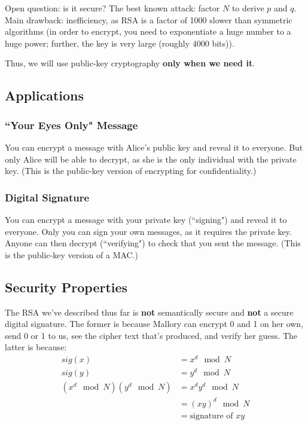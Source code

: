 \documentclass[12pt]{article}
\begin{document}
Open question: is it secure? The best known attack: factor $N$ to derive $p$ and $q$. Main drawback: inefficiency, as RSA is a factor of 1000 slower than symmetric algorithms (in order to encrypt, you need to exponentiate a huge number to a huge power; further, the key is very large (roughly $4000$ bits)).

Thus, we will use public-key cryptography \textbf{only when we need it}.

\subsection*{Applications}

\subsubsection*{``Your Eyes Only" Message}

You can encrypt a message with Alice's public key and reveal it to everyone. But only Alice will be able to decrypt, as she is the only individual with the private key. (This is the public-key version of encrypting for confidentiality.)

\subsubsection*{Digital Signature}

You can encrypt a message with your private key (``signing") and reveal it to everyone. Only you can sign your own messages, as it requires the private key. Anyone can then decrypt (``verifying") to check that you sent the message. (This is the public-key version of a MAC.)

\subsection*{Security Properties}

The RSA we've described thus far is \textbf{not} semantically secure and \textbf{not} a secure digital signature. The former is because Mallory can encrypt 0 and 1 on her own, send 0 or 1 to us, see the cipher text that's produced, and verify her guess. The latter is because:
\begin{align*}
sig(x) &= x^d \mod N \\
sig(y) &= y^d \mod N \\
(x^d \mod N)(y^d \mod N) &= x^d y^d \mod N \\
&= (xy)^d \mod N \\
&= \text{signature of $xy$}
\end{align*}
\end{document}
